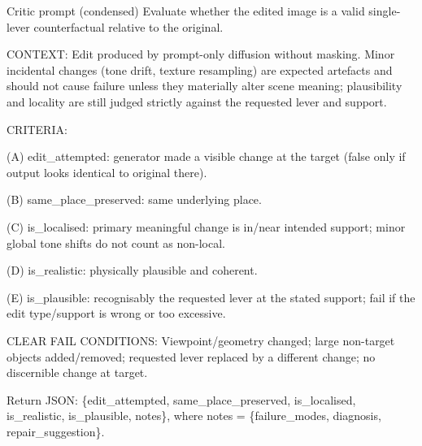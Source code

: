 \begin{promptbox}{Critic prompt (condensed)}
\scriptsize\ttfamily
Evaluate whether the edited image is a valid single-lever
counterfactual relative to the original.\par\medskip
CONTEXT: Edit produced by prompt-only diffusion without masking.
Minor incidental changes (tone drift, texture resampling) are
expected artefacts and should not cause failure unless they
materially alter scene meaning; plausibility and locality are still
judged strictly against the requested lever and support.\par\medskip
CRITERIA:\par\smallskip
(A) edit\_attempted: generator made a visible change at the target
    (false only if output looks identical to original there).\par
(B) same\_place\_preserved: same underlying place.\par
(C) is\_localised: primary meaningful change is in/near intended
    support; minor global tone shifts do not count as non-local.\par
(D) is\_realistic: physically plausible and coherent.\par
(E) is\_plausible: recognisably the requested lever at the stated
    support; fail if the edit type/support is wrong or too
    excessive.\par\medskip
CLEAR FAIL CONDITIONS: Viewpoint/geometry changed; large non-target
objects added/removed; requested lever replaced by a different
change; no discernible change at target.\par\medskip
Return JSON: \{edit\_attempted, same\_place\_preserved,
is\_localised, is\_realistic, is\_plausible, notes\}, where
notes = \{failure\_modes, diagnosis, repair\_suggestion\}.
\end{promptbox}
